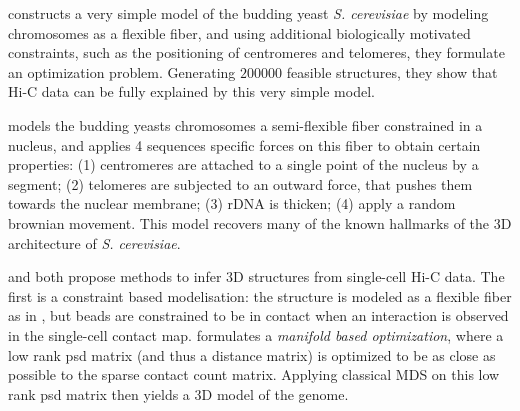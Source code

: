 \citet{tjong:physical} constructs a very simple model of the budding yeast
{\em S. cerevisiae} by modeling chromosomes
as a flexible fiber, and using additional biologically motivated constraints,
such as the positioning of centromeres and telomeres, they formulate an
optimization problem. Generating $200000$ feasible structures, they show that
Hi-C data can be fully explained by this very simple model.

\citet{wong:how} models the budding yeasts chromosomes a semi-flexible fiber
constrained in a nucleus, and applies 4 sequences specific forces on this
fiber to obtain certain properties: (1) centromeres are attached to a single
point of the nucleus by a segment; (2) telomeres are subjected to an outward
force, that pushes them towards the nuclear membrane; (3) rDNA is thicken; (4)
apply a random brownian movement. This model recovers many of the known
hallmarks of the 3D architecture of {\em S. cerevisiae}.

\citet{nagano:single-cell} and \citet{paulsen:manifold} both propose methods
to infer 3D structures from single-cell Hi-C data. The first is a constraint
based modelisation: the structure is modeled as a flexible fiber as in
\citet{tjong:physical}, but beads are constrained to be in contact when an
interaction is observed in the single-cell contact map.
\citet{paulsen:manifold} formulates a \textit{manifold based optimization},
where a low rank psd matrix (and thus a distance matrix) is optimized to be as
close as possible to the sparse contact count matrix. Applying classical MDS
on this low rank psd matrix then yields a 3D model of the genome.

